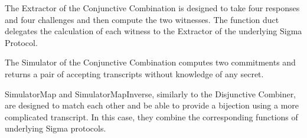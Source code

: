 The Extractor of the Conjunctive Combination is designed to take four responses and four challenges and then compute the two witnesses. 
The function duct delegates the calculation of each witness to the Extractor of the underlying Sigma Protocol.

The Simulator of the Conjunctive Combination computes two commitments and returns a pair of accepting transcripts without knowledge of any secret. 

SimulatorMap and SimulatorMapInverse, similarly to the Disjunctive Combiner, are designed to match each other and be able to provide a 
bijection using a more complicated transcript. In this case, they combine the 
corresponding functions of underlying Sigma protocols.\\
